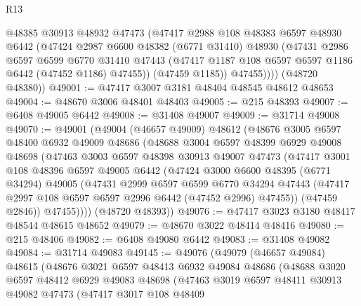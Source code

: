 \begin{lexlean}{R13}
\begin{coremodule}
            @48385
            @30913
            @48932
            @47473
            (@47417
              @2988
              @108
              @48383
              @6597
              @48930
              @6442
              (@47424
                @2987
                @6600
                @48382
                (@6771 @31410)
                @48930
                (@47431
                  @2986
                  @6597
                  @6599
                  @6770
                  @31410
                  @47443
                  (@47417 @1187 @108 @6597 @6597 @1186 @6442 (@47452 @1186) @47455))
                (@47459 @1185))
              @47455))))
      (@48720 @48380))
@49001 := @47417 @3007 @3181 @48404 @48545 @48612 @48653
@49004 := @48670 @3006 @48401 @48403
@49005 := @215 @48393
@49007 := @6408 @49005 @6442
@49008 := @31408 @49007
@49009 := @31714 @49008
@49070 := @49001
    (@49004
      (@46657 @49009)
      @48612
      (@48676
        @3005
        @6597
        @48400
        @6932
        @49009
        @48686
        (@48688
          @3004
          @6597
          @48399
          @6929
          @49008
          @48698
          (@47463
            @3003
            @6597
            @48398
            @30913
            @49007
            @47473
            (@47417
              @3001
              @108
              @48396
              @6597
              @49005
              @6442
              (@47424
                @3000
                @6600
                @48395
                (@6771 @34294)
                @49005
                (@47431
                  @2999
                  @6597
                  @6599
                  @6770
                  @34294
                  @47443
                  (@47417 @2997 @108 @6597 @6597 @2996 @6442 (@47452 @2996) @47455))
                (@47459 @2846))
              @47455))))
      (@48720 @48393))
@49076 := @47417 @3023 @3180 @48417 @48544 @48615 @48652
@49079 := @48670 @3022 @48414 @48416
@49080 := @215 @48406
@49082 := @6408 @49080 @6442
@49083 := @31408 @49082
@49084 := @31714 @49083
@49145 := @49076
    (@49079
      (@46657 @49084)
      @48615
      (@48676
        @3021
        @6597
        @48413
        @6932
        @49084
        @48686
        (@48688
          @3020
          @6597
          @48412
          @6929
          @49083
          @48698
          (@47463
            @3019
            @6597
            @48411
            @30913
            @49082
            @47473
            (@47417
              @3017
              @108
              @48409

\end{coremodule}
\end{lexlean}
